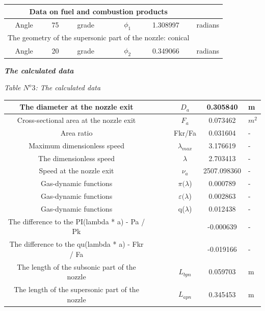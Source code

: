 \begin{center}
\begin{tabular}{  | c | c | c | c | c | c | c | }
\hline
\multicolumn{6}{|c}{Data on fuel and combustion products} & \\
\hline
Angle & 75 & grade &  & $\phi_1$ & 1.308997 & radians \\
\hline
\multicolumn{6}{|c}{The geometry of the supersonic part of the nozzle: conical} & \\
\hline
Angle & 20 & grade &  & $\phi_2$ & 0.349066 & radians \\
\hline
\end{tabular}

\begin{center}
\textbf{\textit{The calculated data}}\\
\end{center}
\begin{flushright}
\textit{Table $N^o 3$: The calculated data}\\
\end{flushright}
\begin{tabular}{  | c | p{1.5cm} | p{1.5cm} | p{1.5cm} | c | c | p{1.5cm} | }
\hline
The diameter at the nozzle exit &  &  &  & $D_a$ & 0.305840 & m \\
\hline
Cross-sectional area at the nozzle exit &  &  &  & $F_a$ & 0.073462 & $m^2$ \\
\hline
Area ratio &  &  &  & Fkr/Fa & 0.031604 & - \\
\hline
Maximum dimensionless speed &  &  &  & $\lambda_{max}$ & 3.176619 & - \\
\hline
The dimensionless speed &  &  &  & $\lambda$ & 2.703413 & - \\
\hline
Speed at the nozzle exit &  &  &  & $\nu_a$ & 2507.098360 & - \\
\hline
Gas-dynamic functions &  &  &  & $\pi(\lambda$) & 0.000789 & - \\
\hline
Gas-dynamic functions &  &  &  & $\varepsilon(\lambda$) & 0.002863 & - \\
\hline
Gas-dynamic functions &  &  &  & q($\lambda$) & 0.012438 & - \\
\hline
The difference to the PI(lambda * a) - Pa / Pk &  &  &  &  & -0.000639 & - \\
\hline
The difference to the qu(lambda * a) - Fkr / Fa &  &  &  &  & -0.019166 & - \\
\hline
The length of the subsonic part of the nozzle &  &  &  & $L_{bpn}$ & 0.059703 & m \\
\hline
The length of the supersonic part of the nozzle &  &  &  & $L_{apn}$ & 0.345453 & m  \\
\hline
\end{tabular}
\end{center}
